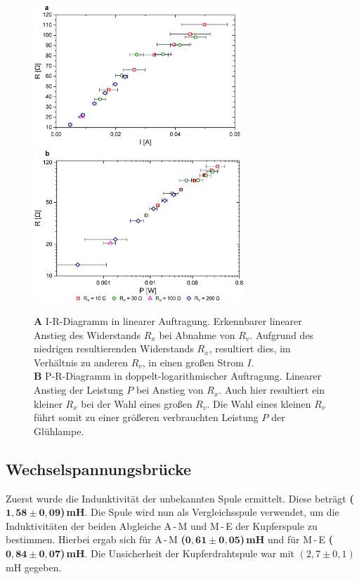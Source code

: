 \documentclass[a4paper,usenatbib]{aspdoc}
\begin{document}
            \begin{figure}
                \centering
                
                \includegraphics[width=78mm]{graphs/bulbir_res1.png}
                \includegraphics[width=79mm]{graphs/bulbpr_res1.png}
                
                \caption{
                    \textbf{A} I-R-Diagramm in linearer Auftragung. Erkennbarer linearer Anstieg des Widerstands $R_x$ bei Abnahme von $R_v$. Aufgrund des niedrigen resultierenden Widerstands $R_x$, resultiert dies, im Verhältnis zu anderen $R_v$, in einen großen Strom $I$. \\
                    \textbf{B} P-R-Diagramm in doppelt-logarithmischer Auftragung. Linearer Anstieg der Leistung $P$ bei Anstieg von $R_x$. Auch hier resultiert ein kleiner $R_x$ bei der Wahl eines großen $R_v$. Die Wahl eines kleinen $R_v$ führt somit zu einer größeren verbrauchten Leistung $P$ der Glühlampe. 
                    }
                \label{fig:bulb}
            \end{figure}
            
        
        \subsection{Wechselspannungsbrücke}\label{subsec:result_wechsel}
            Zuerst wurde die Indunktivität der unbekannten Spule ermittelt. Diese beträgt \textbf{(}$\mathbf{1,58 \pm 0,09}$\textbf{)\,mH}. Die Spule wird nun als Vergleichsspule verwendet, um die Induktivitäten der beiden Abgleiche A\,-\,M und M\,-\,E der Kupferspule zu bestimmen. Hierbei ergab sich für A\,-\,M \textbf{(}$\mathbf{0,61 \pm 0,05}$\textbf{)\,mH} und für M\,-\,E \textbf{(}$\mathbf{0,84 \pm 0,07}$\textbf{)\,mH}. Die Unsicherheit der Kupferdrahtspule war mit $(2,7 \pm 0,1)\,$mH gegeben.
            
\end{document}
